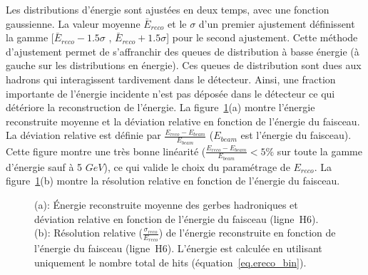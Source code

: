 Les distributions d'énergie sont ajustées en deux temps, avec une fonction gaussienne. La valeur moyenne $\bar{E}_{reco}$ et le $\sigma$ d'un premier ajustement définissent la gamme [$\bar{E}_{reco}-1.5\sigma$ , $\bar{E}_{reco}+1.5\sigma$] pour le second ajustement. Cette méthode d'ajustement permet de s'affranchir des queues de distribution à basse énergie (à gauche sur les distributions en énergie). Ces queues de distribution sont dues aux hadrons qui interagissent tardivement dans le détecteur. Ainsi, une fraction importante de l'énergie incidente n'est pas déposée dans le détecteur ce qui détériore la reconstruction de l'énergie. La figure~\ref{fig:energy_bin}(a) montre l'énergie reconstruite moyenne et la déviation relative en fonction de l'énergie du faisceau. La déviation relative est définie par $\frac{E_{reco}-E_{beam}}{E_{beam}}$ ($E_{beam}$ est l'énergie du faisceau). Cette figure montre une très bonne linéarité ($\frac{E_{reco}-E_{beam}}{E_{beam}}<5\%$ sur toute la gamme d'énergie sauf à 5 $GeV$), ce qui valide le choix du paramétrage de $E_{reco}$. La figure~\ref{fig:energy_bin}(b) montre la résolution relative en fonction de l'énergie du faisceau.
\begin{figure}[!ht]
  \begin{center}
    \caption{(a): Énergie reconstruite moyenne des gerbes hadroniques et déviation relative en fonction de l'énergie du faisceau (ligne~H6). (b): Résolution relative ($\frac{\sigma_{reco}}{E_{reco}}$) de l'énergie reconstruite en fonction de l'énergie du faisceau (ligne~H6). L'énergie est calculée en utilisant uniquement le nombre total de hits (équation~\ref{eq.ereco_bin}).}
    \label{fig:energy_bin}
  \end{center}
\end{figure}

